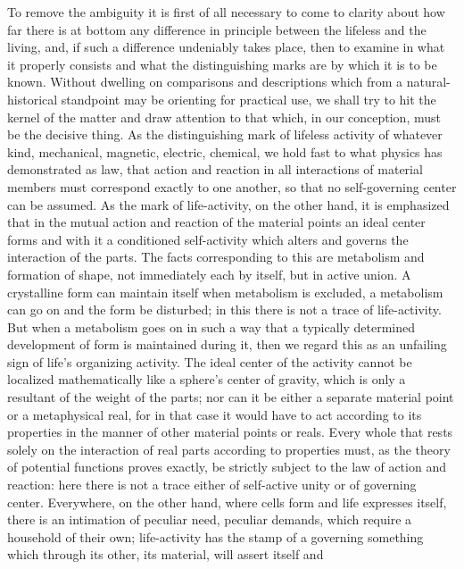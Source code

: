 \documentclass[12pt,a4paper,openany]{book}
\newcommand{\opage}[1]{\marginnote{\footnotesize\textit{[#1]}}}
\begin{document}
\setcounter{footnote}{0}%
\opage{204}To remove the ambiguity it is first of all necessary to come to clarity about how
far there is at bottom any difference in principle between the lifeless and the
living, and, if such a difference undeniably takes place, then to examine in what it
properly consists and what the distinguishing marks are by which it is to be known.
Without dwelling on comparisons and descriptions which from a natural-historical
standpoint may be orienting for practical use, we shall try to hit the kernel of the
matter
and draw attention to that which, in our conception, must be the decisive thing. As
the distinguishing mark of lifeless activity of whatever kind, mechanical, magnetic,
electric, chemical, we hold fast to what physics has demonstrated as law, that action
and reaction in all interactions of material members must correspond exactly to one
another, so that no self-governing center can be assumed. As the mark of life-activity,
on the other hand, it is emphasized that in the mutual action and reaction of the
material points an ideal center forms and with it a conditioned self-activity which
alters and governs the interaction of the parts. The facts corresponding to this are
metabolism and formation of shape, not immediately each by itself, but in active
union. A crystalline form can maintain itself when metabolism is excluded, a metabolism
can go on and the form be disturbed; in this there is not a trace of life-activity.
But when a metabolism goes on in such a way that a typically determined development
of form is maintained during it, then we regard this as an unfailing sign of life's
organizing activity. The ideal center of the activity cannot be localized
mathematically like a sphere's center of gravity, which is only a resultant of the
weight of the parts; nor can it be either a separate material point or a metaphysical
real, for in that case it would have to act according to its properties in the manner
of other material points or reals. Every whole that rests solely on the interaction of
real parts according to properties must, as the theory of potential functions proves
exactly, be
\setcounter{footnote}{0}%
\opage{205}strictly subject to the law of action and reaction: here there is not a trace
either of self-active unity or of governing center. Everywhere, on the other hand,
where cells form and life expresses itself, there is an intimation of peculiar need,
peculiar demands, which require a household of their own; life-activity has the stamp
of a governing something which through its other, its material, will assert itself and
\end{document}
